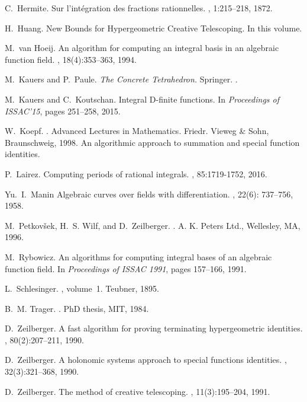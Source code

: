 \documentclass{sig-alternate}
\begin{document}
\begin{thebibliography}{10}
C.~Hermite.
\newblock Sur l'int\'egration des fractions rationnelles.
, 1:215--218, 1872.

  H.~Huang.
  \newblock New Bounds for Hypergeometric Creative Telescoping.
  \newblock In this volume.

M.~van Hoeij.
\newblock An algorithm for computing an integral basis in an algebraic function
  field.
, 18(4):353--363, 1994.

  M.~Kauers and P.~Paule.
  \newblock \emph{The Concrete Tetrahedron.}
  \newblock Springer.
  .

M.~Kauers and C.~Koutschan.
\newblock Integral {D}-finite functions.
\newblock In {\em Proceedings of ISSAC'15}, pages 251--258, 2015.

W.~Koepf.
.
\newblock Advanced Lectures in Mathematics. Friedr. Vieweg \& Sohn,
  Braunschweig, 1998.
\newblock An algorithmic approach to summation and special function identities.

P.~Lairez.
\newblock Computing periods of rational integrals.
, 85:1719-1752, 2016.

Yu.~I.~Manin
\newblock Algebraic curves over fields with differentiation.
, 22(6): 737--756, 1958.

M.~Petkov{\v{s}}ek, H.~S. Wilf, and D.~Zeilberger.
.
\newblock A. K. Peters Ltd., Wellesley, MA, 1996.

M.~Rybowicz.
\newblock An algorithms for computing integral bases of an algebraic function
  field.
\newblock In {\em Proceedings of ISSAC 1991}, pages 157--166, 1991.

L.~Schlesinger.
,
  volume~1.
\newblock Teubner, 1895.

B.~M. Trager.
.
\newblock PhD thesis, MIT, 1984.

D.~Zeilberger.
\newblock A fast algorithm for proving terminating hypergeometric identities.
, 80(2):207--211, 1990.

D.~Zeilberger.
\newblock A holonomic systems approach to special functions identities.
,
  32(3):321--368, 1990.

D.~Zeilberger.
\newblock The method of creative telescoping.
, 11(3):195--204, 1991.

\end{thebibliography}
\end{document}

